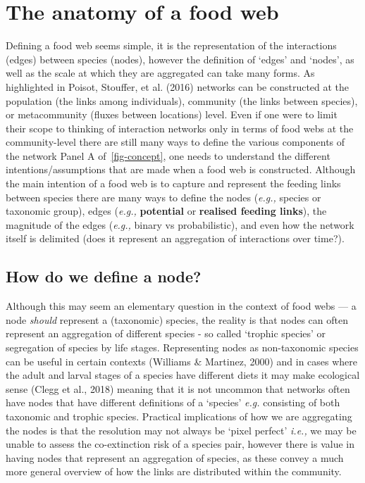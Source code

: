 \documentclass[
]{article}
\begin{document}
\section{The anatomy of a food web}\label{sec-network-anatomy}

Defining a food web seems simple, it is the representation of the
interactions (edges) between species (nodes), however the definition of
`edges' and `nodes', as well as the scale at which they are aggregated
can take many forms. As highlighted in Poisot, Stouffer, et al. (2016)
networks can be constructed at the population (the links among
individuals), community (the links between species), or metacommunity
(fluxes between locations) level. Even if one were to limit their scope
to thinking of interaction networks only in terms of food webs at the
community-level there are still many ways to define the various
components of the network Panel A of~\ref{fig-concept}, one needs to
understand the different intentions/assumptions that are made when a
food web is constructed. Although the main intention of a food web is to
capture and represent the feeding links between species there are many
ways to define the nodes (\emph{e.g.,} species or taxonomic group),
edges (\emph{e.g.,} \textbf{potential} or \textbf{realised feeding
links}), the magnitude of the edges (\emph{e.g.,} binary vs
probabilistic), and even how the network itself is delimited (does it
represent an aggregation of interactions over time?).

\subsection{How do we define a node?}\label{how-do-we-define-a-node}

Although this may seem an elementary question in the context of food
webs --- a node \emph{should} represent a (taxonomic) species, the
reality is that nodes can often represent an aggregation of different
species - so called `trophic species' or segregation of species by life
stages. Representing nodes as non-taxonomic species can be useful in
certain contexts (Williams \& Martinez, 2000) and in cases where the
adult and larval stages of a species have different diets it may make
ecological sense (Clegg et al., 2018) meaning that it is not uncommon
that networks often have nodes that have different definitions of a
`species' \emph{e.g.} consisting of both taxonomic and trophic species.
Practical implications of how we are aggregating the nodes is that the
resolution may not always be `pixel perfect' \emph{i.e.,} we may be
unable to assess the co-extinction risk of a species pair, however there
is value in having nodes that represent an aggregation of species, as
these convey a much more general overview of how the links are
distributed within the community.
\end{document}
